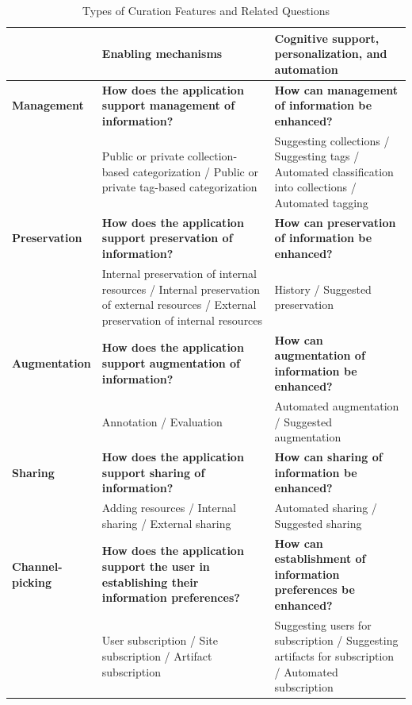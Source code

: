 \documentclass[review]{elsarticle}
\begin{document}
{{\begin{table}[!htbp]
\begin{tabular}{|p{0.2\linewidth}| p{0.45\linewidth}| p{0.4\linewidth}|}
 & Enabling mechanisms & Cognitive support, personalization, and automation \\
\hline
\textbf{Management} & \textbf{How does the application support management of information?} & \textbf{How can management of information be enhanced?}\\
& Public or private collection-based categorization / Public or private tag-based categorization & Suggesting collections / Suggesting tags / Automated classification into collections / Automated tagging \\
\textbf{Preservation} & \textbf{How does the application support preservation of information?} & \textbf{How can preservation of information be enhanced?}\\
& Internal preservation of internal resources / Internal preservation of external resources / External preservation of internal resources & History / Suggested preservation  \\
\textbf{Augmentation} & \textbf{How does the application support augmentation of information?} & \textbf{How can augmentation of information be enhanced?}\\
& Annotation / Evaluation & Automated augmentation / Suggested augmentation \\ 
\textbf{Sharing} & \textbf{How does the application support sharing of information?} & \textbf{How can sharing of information be enhanced?}\\
& Adding resources / Internal sharing / External sharing & Automated sharing / Suggested sharing \\
\textbf{Channel-picking}  	& \textbf{How does the application support the user in establishing their information preferences?} & \textbf{How can establishment of information preferences be enhanced?}\\
& User subscription / Site subscription / Artifact subscription & Suggesting users for subscription / Suggesting artifacts for subscription / Automated subscription \\     
\hline
\end{tabular}
\caption{Types of Curation Features and Related Questions}
\label{table:framework_curation} 
\end{table}

}}
\end{document}
